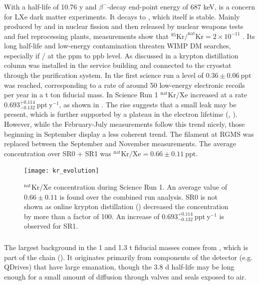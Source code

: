 \subsubsection{}
\label{subsubsec:backgrounds_electronic_krypton}
With a half-life of 10.76 y and $\beta^-$-decay end-point energy of 687 keV,  is a concern for LXe dark matter
experiments.  It decays to , which itself is stable.  Mainly
produced by  and  in nuclear fission and then released by nuclear weapons tests and fuel reprocessing plants,
measurements show that $\mathrm{^{85}Kr / ^{nat}Kr} = 2 \times 10^{-11}$ .  Its long half-life and low-energy
contamination threaten WIMP DM searches, especially if / at the ppm to ppb level.  As discussed in
 a krypton distillation column was installed in the service building and connected to the cryostat through
the purification system.  In the first science run a level of $0.36 \pm 0.06\ \mathrm{ppt}$ was reached, corresponding to a rate of
around 50 low-energy electronic recoils per year in a t ton fiducial mass.  In Science Run 1 $\mathrm{^{nat}Kr / Xe}$ increased at a rate
$0.693_{-0.132}^{+0.114}\ \mathrm{ppt\ y^{-1}}$, as shown in
.  The rise suggests that a small leak may be present, which is further supported
by a plateau in the electron lifetime (, ).  However, while the February-July
measurements follow this trend nicely, those beginning in September display a less coherent trend.  The filament at RGMS was replaced
between the September and November measurements.  The average concentration over SR0 + SR1 was
$^{\mathrm{nat}}\mathrm{Kr}/\mathrm{Xe} = 0.66 \pm 0.11\ \mathrm{ppt}$.

\begin{figure}
\centering
\texttt{[image: kr\_evolution]}
\caption{$\mathrm{^{nat}Kr / Xe}$ concentration during Science Run 1.  An average value of $0.66 \pm 0.11$ is found over the combined
run analysis.  SR0 is not shown as online krypton distillation () decreased the concentration by more than
a factor of 100.  An increase of $0.693_{-0.132}^{+0.114}\ \mathrm{ppt\ y^{-1}}$ is observed for SR1.}
\label{fig:backgrounds_electronic_krypton_rate_increase}
\end{figure}

\subsubsection{}
\label{subsubsec:backgrounds_electronic_radon}
The largest background in the 1 and 1.3 t fiducial masses comes from , which is part of the  chain
().  It originates primarily from components of the detector (e.g. QDrives) that have large
 emanation, though the 3.8 d half-life may be long enough for a small amount of diffusion through valves and seals
exposed to air.

